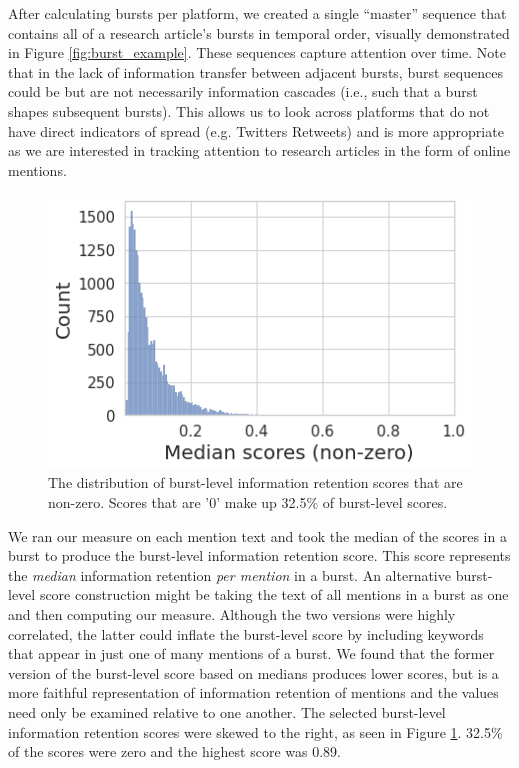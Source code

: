 \documentclass[letterpaper]{article} %
\begin{document}
After calculating bursts per platform, we created a single ``master'' sequence that contains all of a research article's bursts in temporal order, visually demonstrated in Figure \ref{fig:burst_example}. These sequences capture attention over time. Note that in the lack of information transfer between adjacent bursts, burst sequences could be but are not necessarily information cascades (i.e., such that a burst shapes subsequent bursts). This allows us to look across platforms that do not have direct indicators of spread (e.g. Twitters Retweets) and is more appropriate as we are interested in tracking attention to research articles in the form of online mentions.

\begin{figure}[t]
    \centering
    \includegraphics[width=0.85\columnwidth]{figs/fig2.png}
    \caption{The distribution of burst-level information retention scores that are non-zero. Scores that are '0' make up 32.5\% of burst-level scores.}
    \label{fig:score_distribution}
\end{figure}

We ran our measure on each mention text and took the median of the scores in a burst to produce the burst-level information retention score. This score represents the \textit{median} information retention \textit{per mention} in a burst. An alternative burst-level score construction might be taking the text of all mentions in a burst as one and then computing our measure. Although the two versions were highly correlated, the latter could inflate the burst-level score by including keywords that appear in just one of many mentions of a burst. We found that the former version of the burst-level score based on medians produces lower scores, but is a more faithful representation of information retention of mentions and the values need only be examined relative to one another.
The selected burst-level information retention scores were skewed to the right, as seen in Figure \ref{fig:score_distribution}. 32.5\% of the scores were zero and the highest score was 0.89.
\end{document}
